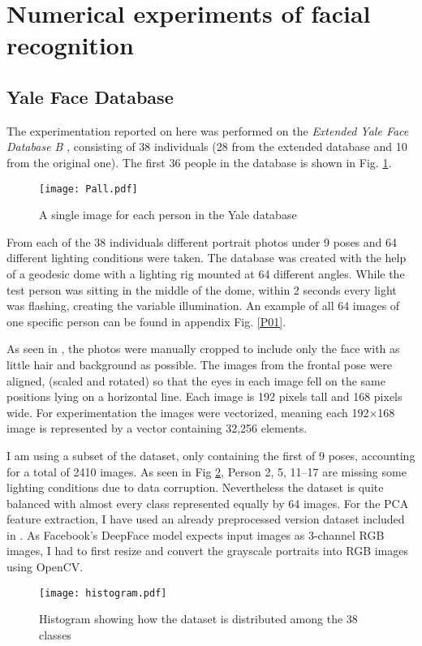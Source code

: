 \section{Numerical experiments of facial recognition}
\subsection{Yale Face Database}
The experimentation reported on here was performed on the \textit{Extended Yale
Face Database B} \cite{yalefaceB}, consisting of 38 individuals (28 from the
extended database and 10 from the original one)\footnotemark. The first 36
people in the database is shown in Fig. \ref{Pall}.


\begin{figure}[h]
  \centering
  \texttt{[image: Pall.pdf]} 
  \caption{A single image for each person in the Yale database}
  \label{Pall}
\end{figure}

From each of the 38 individuals different portrait photos under 9 poses and 64
different lighting conditions were taken. The database was created with the help
of a geodesic dome with a lighting rig mounted at 64 different angles. While the
test person was sitting in the middle of the dome, within 2 seconds every light
was flashing, creating the variable illumination. An example of all 64 images of
one specific person can be found in appendix Fig. \ref{P01}.

As seen in \cite{yalefaceBcropped}, the photos were manually cropped to include
only the face with as little hair and background as possible. The images from
the frontal pose were aligned, (scaled and rotated) so that the eyes in each
image fell on the same positions lying on a horizontal line. Each image is 192
pixels tall and 168 pixels wide. For experimentation the images were vectorized,
meaning each 192$\times$168 image is represented by a vector containing 32,256
elements. 

I am using a subset of the dataset, only containing the first of 9 poses,
accounting for a total of 2410 images. As seen in Fig \ref{histogram}, Person 2,
5, 11--17 are missing some lighting conditions due to data corruption.
Nevertheless the dataset is quite balanced with almost every class represented
equally by 64 images. For the PCA feature extraction, I have used an already
preprocessed version dataset included in \cite{brunton2019data}. As Facebook's
DeepFace model expects input images as 3-channel RGB images, I had to first
resize and convert the grayscale portraits into RGB images using
OpenCV\cite{opencv_library}.

\begin{figure}[h]
  \centering
  \texttt{[image: histogram.pdf]}
  \caption{Histogram showing how the dataset is distributed among the 38 classes}
  \label{histogram}
\end{figure}

